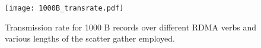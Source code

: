 \begin{figure}[t]
\texttt{[image: 1000B\_transrate.pdf]}
\caption{Transmission rate for 1000 B records over different RDMA verbs and 
various lengths of the scatter gather employed.}
\label{fig:1000B_transrate}
\end{figure}
